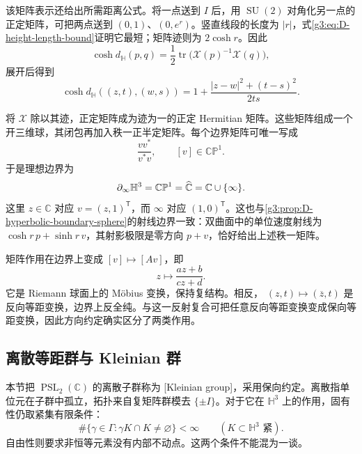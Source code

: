 该矩阵表示还给出所需距离公式。将一点送到 \(I\) 后，用 \(\operatorname{SU}(2)\) 对角化另一点的正定矩阵，可把两点送到 \((0,1)\)、\((0,e^r)\)。竖直线段的长度为 \(|r|\)，式\eqref{g3:eq:D-height-length-bound}证明它最短；矩阵迹则为 \(2\cosh r\)。因此
\[
	\cosh d_{\mathbb H}(p,q)
	=\frac12\operatorname{tr}\bigl(\mathcal X(p)^{-1}\mathcal X(q)\bigr),
\]
展开后得到
\begin{equation}\label{g3:eq:D-upper-halfspace-distance}
	\cosh d_{\mathbb H}((z,t),(w,s))
	=1+\frac{|z-w|^2+(t-s)^2}{2ts}.
\end{equation}

\ProseParagraphBreak
将 \(\mathcal X\) 除以其迹，正定矩阵成为迹为一的正定 Hermitian 矩阵。这些矩阵组成一个开三维球，其闭包再加入秩一正半定矩阵。每个边界矩阵可唯一写成
\[
	\frac{vv^*}{v^*v},\qquad [v]\in\mathbb{CP}^1.
\]
于是理想边界为
\begin{equation}\label{g3:eq:D-hyperbolic-ideal-boundary}
	\partial_\infty\mathbb H^3
	    =\mathbb{CP}^1=\widehat{\mathbb C\mkern0mu}
	    =\mathbb C\cup\{\infty\}.
\end{equation}
这里 \(z\in\mathbb C\) 对应 \(v=(z,1)^{\mathsf T}\)，而 \(\infty\) 对应
\((1,0)^{\mathsf T}\)。这也与\cref{g3:prop:D-hyperbolic-boundary-sphere}的射线边界一致：双曲面中的单位速度射线为
\(\cosh r\,p+\sinh r\,v\)，其射影极限是零方向 \(p+v\)，恰好给出上述秩一矩阵。

\ProseParagraphBreak
矩阵作用在边界上变成 \([v]\mapsto[Av]\)，即
\[
	z\longmapsto\frac{az+b}{cz+d}.
\]
它是 Riemann 球面上的 Möbius 变换，保持复结构。相反，
\((z,t)\mapsto(\overline z,t)\) 是反向等距变换，边界上反全纯。与这一反射复合可把任意反向等距变换变成保向等距变换，因此方向约定确实区分了两类作用。

\subsection{离散等距群与 Kleinian 群}
\label{g3:subsec:D04:02}

本节把 \(\operatorname{PSL}_2(\mathbb C)\) 的离散子群称为
[Kleinian group]，采用保向约定。离散指单位元在子群中孤立，拓扑来自复矩阵群模去 \(\{\pm I\}\)。对于它在 \(\mathbb H^3\) 上的作用，固有性仍取紧集有限条件：
\[
	\#\{\gamma\in\Gamma:\gamma K\cap K\ne\varnothing\}<\infty
	\qquad(K\subset\mathbb H^3\text{ 紧}).
\]
自由性则要求非恒等元素没有内部不动点。这两个条件不能混为一谈。

